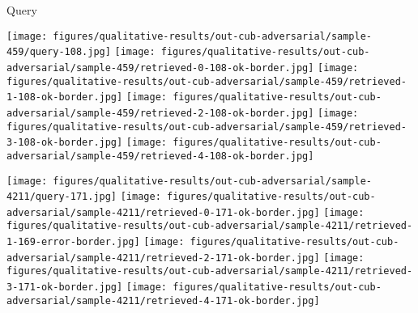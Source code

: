 \documentclass[10pt,journal,compsoc]{IEEEtran}
\begin{document}
\begin{figure*}[htbp]
    \begin{center}
    \begin{minipage}{0.16\textwidth}
    \centering
    Query
    \end{minipage}
    \begin{minipage}{0.16\textwidth}
    \end{minipage}
    \begin{minipage}{0.16\textwidth}
    \end{minipage}
    \begin{minipage}{0.16\textwidth}
    \end{minipage}
    \begin{minipage}{0.16\textwidth}
    \end{minipage}
    \begin{minipage}{0.16\textwidth}
    \end{minipage}
    \hspace{0.5cm}

    \texttt{[image: figures/qualitative-results/out-cub-adversarial/sample-459/query-108.jpg]}
    \texttt{[image: figures/qualitative-results/out-cub-adversarial/sample-459/retrieved-0-108-ok-border.jpg]}
    \texttt{[image: figures/qualitative-results/out-cub-adversarial/sample-459/retrieved-1-108-ok-border.jpg]}
    \texttt{[image: figures/qualitative-results/out-cub-adversarial/sample-459/retrieved-2-108-ok-border.jpg]}
    \texttt{[image: figures/qualitative-results/out-cub-adversarial/sample-459/retrieved-3-108-ok-border.jpg]}
    \texttt{[image: figures/qualitative-results/out-cub-adversarial/sample-459/retrieved-4-108-ok-border.jpg]}

    \vspace{0.2cm}
    \texttt{[image: figures/qualitative-results/out-cub-adversarial/sample-4211/query-171.jpg]}
    \texttt{[image: figures/qualitative-results/out-cub-adversarial/sample-4211/retrieved-0-171-ok-border.jpg]}
    \texttt{[image: figures/qualitative-results/out-cub-adversarial/sample-4211/retrieved-1-169-error-border.jpg]}
    \texttt{[image: figures/qualitative-results/out-cub-adversarial/sample-4211/retrieved-2-171-ok-border.jpg]}
    \texttt{[image: figures/qualitative-results/out-cub-adversarial/sample-4211/retrieved-3-171-ok-border.jpg]}
    \texttt{[image: figures/qualitative-results/out-cub-adversarial/sample-4211/retrieved-4-171-ok-border.jpg]}


\end{center}
\end{figure*}
\end{document}
